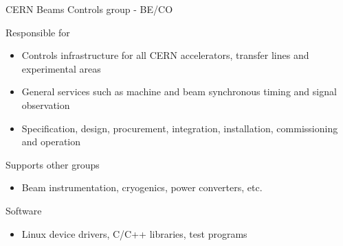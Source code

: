 \documentclass[compress,red]{beamer}
\begin{document}
\begin{frame}{CERN Beams Controls group - BE/CO}

  \begin{block}{Responsible for}
    \begin{itemize}
    \item
      Controls infrastructure for all CERN accelerators, transfer lines and experimental areas
    \item
      General services such as machine and beam synchronous timing and signal observation
    \item
      Specification, design, procurement, integration, installation, commissioning and operation
    \end{itemize}
  \end{block}

  \begin{block}{Supports other groups}
    \begin{itemize}
    \item
      Beam instrumentation, cryogenics, power converters, etc.
    \end{itemize}
  \end{block}

  \begin{block}{Software}
    \begin{itemize}
    \item
      Linux device drivers, C/C++ libraries, test programs
    \end{itemize}
  \end{block}

\end{frame}
\end{document}
